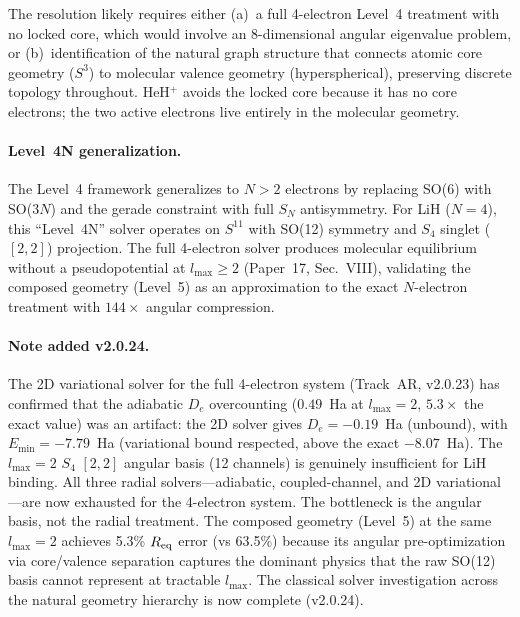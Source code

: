 \documentclass[aps,pra,twocolumn,superscriptaddress,longbibliography]{revtex4-2}
\begin{document}
The resolution likely requires either (a)~a full 4-electron Level~4
treatment with no locked core, which would involve an 8-dimensional
angular eigenvalue problem, or (b)~identification of the natural graph
structure that connects atomic core geometry ($S^3$) to molecular valence
geometry (hyperspherical), preserving discrete topology throughout.
HeH$^+$ avoids the locked core because it has no core electrons; the two active
electrons live entirely in the molecular geometry.

\paragraph{Level~4N generalization.}
The Level~4 framework generalizes to $N > 2$ electrons by replacing
SO(6) with SO($3N$) and the gerade constraint with full $S_N$
antisymmetry.  For LiH ($N=4$), this ``Level~4N'' solver operates
on $S^{11}$ with SO(12) symmetry and $S_4$ singlet ($[2,2]$)
projection.  The full 4-electron solver produces molecular equilibrium
without a pseudopotential at $l_{\max} \geq 2$ (Paper~17, Sec.~VIII),
validating the composed geometry (Level~5) as an approximation to the
exact $N$-electron treatment with $144{\times}$ angular compression.

\paragraph{Note added v2.0.24.}
The 2D variational solver for the full 4-electron system (Track~AR,
v2.0.23) has confirmed that the adiabatic $D_e$ overcounting
($0.49$~Ha at $l_{\max} = 2$, $5.3{\times}$ the exact value) was an
artifact: the 2D solver gives $D_e = -0.19$~Ha (unbound), with
$E_{\min} = -7.79$~Ha (variational bound respected, above the exact
$-8.07$~Ha).  The $l_{\max} = 2$ $S_4$ $[2,2]$ angular basis (12
channels) is genuinely insufficient for LiH binding.  All three
radial solvers---adiabatic, coupled-channel, and 2D
variational---are now exhausted for the 4-electron system.  The
bottleneck is the angular basis, not the radial treatment.  The
composed geometry (Level~5) at the same $l_{\max} = 2$ achieves
5.3\% $R_{\rm eq}$ error (vs 63.5\%) because its angular
pre-optimization via core/valence separation captures the dominant
physics that the raw SO(12) basis cannot represent at tractable
$l_{\max}$.  The classical solver investigation across the natural
geometry hierarchy is now complete (v2.0.24).
\end{document}
